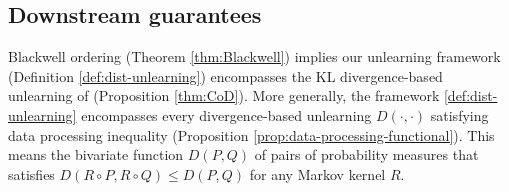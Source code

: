 \subsection{Downstream guarantees}
\vspace{-2 mm}
 Blackwell ordering (Theorem \ref{thm:Blackwell}) implies our unlearning framework (Definition \ref{def:dist-unlearning}) encompasses the KL divergence-based unlearning of \cite{allouah2025distributionalmachineunlearningselective} (Proposition \ref{thm:CoD}). More generally, the framework \ref{def:dist-unlearning} encompasses every divergence-based unlearning $D(\cdot, \cdot)$ satisfying data processing inequality (Proposition \ref{prop:data-processing-functional}). This means the bivariate function $D(P, Q)$ of pairs of probability measures that satisfies $D(R\circ P, R\circ Q) \leq D(P,Q)$ for any Markov kernel $R$.

